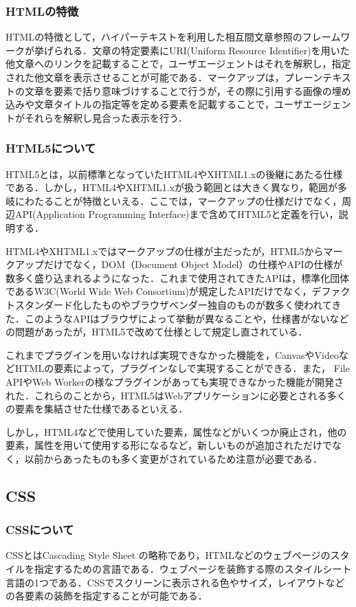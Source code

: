 \documentclass[a4j,12pt]{jarticle}
\begin{document}
\subsubsection{HTMLの特徴}
HTMLの特徴として，ハイパーテキストを利用した相互間文章参照のフレームワークが挙げられる．文章の特定要素にURI(Uniform Resource Identifier)を用いた他文章へのリンクを記載することで，ユーザエージェントはそれを解釈し，指定された他文章を表示させることが可能である．マークアップは，プレーンテキストの文章を要素で括り意味づけすることで行うが，その際に引用する画像の埋め込みや文章タイトルの指定等を定める要素を記載することで，ユーザエージェントがそれらを解釈し見合った表示を行う\cite{ren8}．
\subsubsection{HTML5について}
HTML5とは，以前標準となっていたHTML4やXHTML1.xの後継にあたる仕様である．しかし，HTML4やXHTML1.xが扱う範囲とは大きく異なり，範囲が多岐にわたることが特徴といえる．ここでは，マークアップの仕様だけでなく，周辺API(Application Programming Interface)まで含めてHTML5と定義を行い，説明する．

HTML4やXHTML1.xではマークアップの仕様が主だったが，HTML5からマークアップだけでなく，DOM（Document Object Model）の仕様やAPIの仕様が数多く盛り込まれるようになった．これまで使用されてきたAPIは，標準化団体であるW3C(World Wide Web Consortium)が規定したAPIだけでなく，デファクトスタンダード化したものやブラウザベンダー独自のものが数多く使われてきた．このようなAPIはブラウザによって挙動が異なることや，仕様書がないなどの問題があったが，HTML5で改めて仕様として規定し直されている．


これまでプラグインを用いなければ実現できなかった機能を，CanvasやVideoなどHTMLの要素によって，プラグインなしで実現することができる．また，
File APIやWeb Workerの様なプラグインがあっても実現できなかった機能が開発された．これらのことから，HTML5はWebアプリケーションに必要とされる多くの要素を集結させた仕様であるといえる．

しかし，HTML4などで使用していた要素，属性などがいくつか廃止され，他の要素，属性を用いて使用する形になるなど，新しいものが追加されただけでなく，以前からあったものも多く変更がされているため注意が必要である\cite{ren8}．
\newpage
\subsection{CSS}
\subsubsection{CSSについて}
CSSとはCascading Style Sheet の略称であり，HTMLなどのウェブページのスタイルを指定するための言語である．ウェブページを装飾する際のスタイルシート言語の1つである．CSSでスクリーンに表示される色やサイズ，レイアウトなどの各要素の装飾を指定することが可能である．
\end{document}
